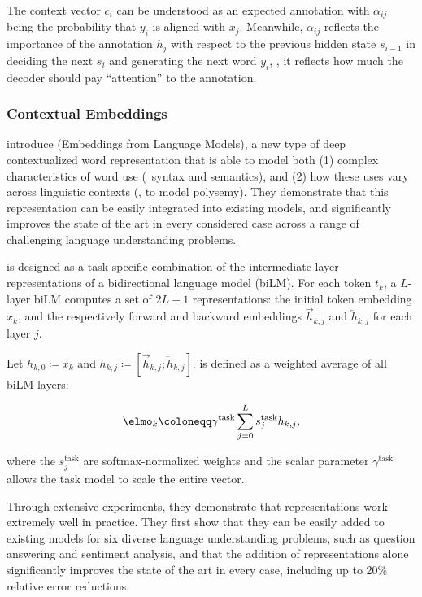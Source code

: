 The context vector $c_i$ can be understood as an expected annotation with $\alpha_{ij}$ being the probability that $y_i$ is aligned with $x_j$. Meanwhile, $\alpha_{ij}$ reflects the importance of the annotation $h_j$ with respect to the previous hidden state $s_{i-1}$ in deciding the next $s_i$ and generating the next word $y_i$, \ie, it reflects how much the decoder should pay ``attention'' to the annotation.

\subsubsection{Contextual Embeddings}

\citet{peters-etal-2018-deep} introduce {\elmo} (Embeddings from Language Models), a new type of deep contextualized word representation that is able to model both (1) complex characteristics of word use ({\eg}\ syntax and semantics), and (2) how these uses vary across linguistic contexts ({\ie}, to model polysemy). They demonstrate that this representation can be easily integrated into existing models, and significantly improves the state of the art in every considered case across a range of challenging language understanding problems.

{\elmo} is designed as a task specific combination of the intermediate layer representations of a bidirectional language model (biLM). For each token $t_k$, a $L$-layer biLM computes a set of $2L + 1$ representations: the initial token embedding $x_k$, and the respectively forward and backward embeddings $\overrightarrow{h}_{k,j}$ and $\overleftarrow{h}_{k,j}$ for each layer $j$.

Let $h_{k,0} \coloneqq x_k$ and $h_{k,j} \coloneqq \left[ \overrightarrow{h}_{k,j} ; \overleftarrow{h}_{k,j} \right]$. {\elmo} is defined as a weighted average of all biLM layers:

\[ \elmo_k \coloneqq \gamma^{\mathrm{task}} \sum_{j=0}^L s^{\mathrm{task}}_j h_{k,j} , \]

where the $s^{\mathrm{task}}_j$ are softmax-normalized weights and
the scalar parameter $\gamma^{\mathrm{task}}$ allows the task model to scale the entire {\elmo} vector.

Through extensive experiments, they demonstrate that {\elmo} representations work extremely well in practice. They first show that they can be easily added to existing models for six diverse language understanding problems, such as question answering and sentiment analysis, and that the addition of {\elmo} representations alone significantly improves the state of the art in every case, including up to 20\% relative error reductions. 

